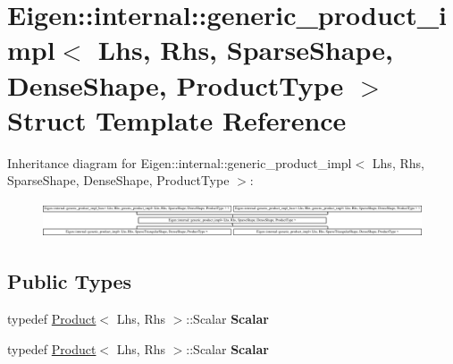 \hypertarget{struct_eigen_1_1internal_1_1generic__product__impl_3_01_lhs_00_01_rhs_00_01_sparse_shape_00_01_d233f0596d1aaf62fecbcef5d636a2696}{}\section{Eigen\+:\+:internal\+:\+:generic\+\_\+product\+\_\+impl$<$ Lhs, Rhs, Sparse\+Shape, Dense\+Shape, Product\+Type $>$ Struct Template Reference}
\label{struct_eigen_1_1internal_1_1generic__product__impl_3_01_lhs_00_01_rhs_00_01_sparse_shape_00_01_d233f0596d1aaf62fecbcef5d636a2696}
Inheritance diagram for Eigen\+:\+:internal\+:\+:generic\+\_\+product\+\_\+impl$<$ Lhs, Rhs, Sparse\+Shape, Dense\+Shape, Product\+Type $>$\+:\begin{figure}[H]
\begin{center}
\leavevmode
\includegraphics[height=1.065990cm]{struct_eigen_1_1internal_1_1generic__product__impl_3_01_lhs_00_01_rhs_00_01_sparse_shape_00_01_d233f0596d1aaf62fecbcef5d636a2696}
\end{center}
\end{figure}
\subsection*{Public Types}
\begin{DoxyCompactItemize}
\item 
\mbox{\label{struct_eigen_1_1internal_1_1generic__product__impl_3_01_lhs_00_01_rhs_00_01_sparse_shape_00_01_d233f0596d1aaf62fecbcef5d636a2696_a1f24147d5937331846219c60aef84c14}} 
typedef \hyperlink{group___core___module_class_eigen_1_1_product}{Product}$<$ Lhs, Rhs $>$\+::Scalar {\bfseries Scalar}
\item 
\mbox{\label{struct_eigen_1_1internal_1_1generic__product__impl_3_01_lhs_00_01_rhs_00_01_sparse_shape_00_01_d233f0596d1aaf62fecbcef5d636a2696_a1f24147d5937331846219c60aef84c14}} 
typedef \hyperlink{group___core___module_class_eigen_1_1_product}{Product}$<$ Lhs, Rhs $>$\+::Scalar {\bfseries Scalar}
\end{DoxyCompactItemize}
